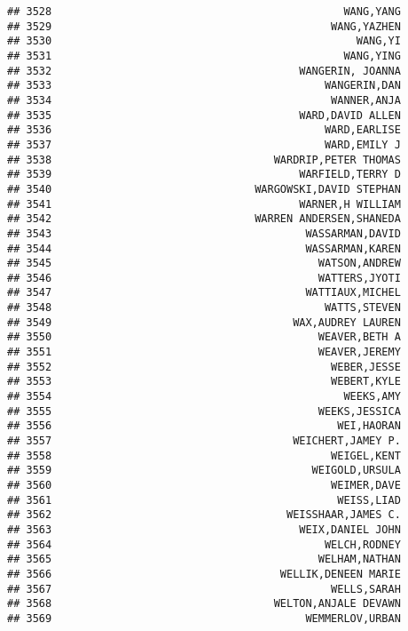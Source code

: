 \documentclass[
]{article}
\begin{document}
\begin{verbatim}
## 3528                                              WANG,YANG
## 3529                                            WANG,YAZHEN
## 3530                                                WANG,YI
## 3531                                              WANG,YING
## 3532                                       WANGERIN, JOANNA
## 3533                                           WANGERIN,DAN
## 3534                                            WANNER,ANJA
## 3535                                       WARD,DAVID ALLEN
## 3536                                           WARD,EARLISE
## 3537                                           WARD,EMILY J
## 3538                                   WARDRIP,PETER THOMAS
## 3539                                       WARFIELD,TERRY D
## 3540                                WARGOWSKI,DAVID STEPHAN
## 3541                                       WARNER,H WILLIAM
## 3542                                WARREN ANDERSEN,SHANEDA
## 3543                                        WASSARMAN,DAVID
## 3544                                        WASSARMAN,KAREN
## 3545                                          WATSON,ANDREW
## 3546                                          WATTERS,JYOTI
## 3547                                        WATTIAUX,MICHEL
## 3548                                           WATTS,STEVEN
## 3549                                      WAX,AUDREY LAUREN
## 3550                                          WEAVER,BETH A
## 3551                                          WEAVER,JEREMY
## 3552                                            WEBER,JESSE
## 3553                                            WEBERT,KYLE
## 3554                                              WEEKS,AMY
## 3555                                          WEEKS,JESSICA
## 3556                                             WEI,HAORAN
## 3557                                      WEICHERT,JAMEY P.
## 3558                                            WEIGEL,KENT
## 3559                                         WEIGOLD,URSULA
## 3560                                            WEIMER,DAVE
## 3561                                             WEISS,LIAD
## 3562                                     WEISSHAAR,JAMES C.
## 3563                                       WEIX,DANIEL JOHN
## 3564                                           WELCH,RODNEY
## 3565                                          WELHAM,NATHAN
## 3566                                    WELLIK,DENEEN MARIE
## 3567                                            WELLS,SARAH
## 3568                                   WELTON,ANJALE DEVAWN
## 3569                                        WEMMERLOV,URBAN

\end{verbatim}
\end{document}
